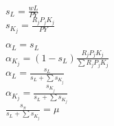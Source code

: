 \documentclass[letterpaper,12pt]{article}
\theoremstyle{definition}
\begin{document}
\begin{enumerate}
$s_{L} = \frac{wL}{PY}$\\

$s_{K_{j}}  = \frac{ R_{j}P_{j}K_{j}}{PY}$

$\alpha_{L} = s_{L} $ \\

$ \alpha_{K_{j}}  = (1 -  s_{L}) \frac{R_{j}P_{j}K_{j}}{\sum R_{j}P_{j}K_{j}}$\\
	
$\alpha_{L} =  \frac{s_{L}}{s_{L} + \sum s_{K_{j}}} $ \\

$\alpha_{K_{j}}=  \frac{s_{K_{j}}}{s_{L} + \sum s_{K_{j}}} $ \\
	
$\frac{s_{\pi}}{s_{L} + \sum s_{K_{j}}} =  \mu $\\



\end{enumerate}

\vspace{25mm}
\end{document}
